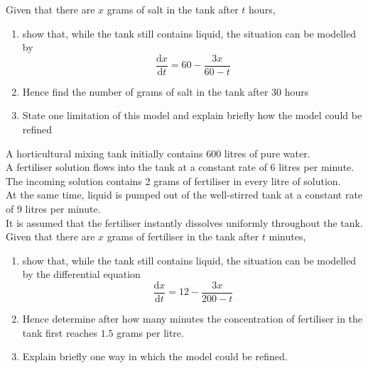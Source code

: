 \documentclass[leqno]{article}
\begin{document}
\begin{enumerate}[
  label=\textbf{\arabic*.},
  leftmargin=*,
  topsep=0pt,
  partopsep=0pt,
  parsep=0pt
]
Given that there are $x$ grams of salt in the tank after $t$ hours, \\
\begin{enumerate}[label=\textbf{(\alph*)}]
  \item show that, while the tank still contains liquid, the situation can be modelled by
  \[
  \frac{\mathrm{d}x}{\mathrm{d}t}=60-\frac{3x}{60-t}
  \] 
  \item Hence find the number of grams of salt in the tank after $30$ hours  \\
  \item State one limitation of this model and explain briefly how the model could be refined  \\
\end{enumerate}

\newpage

\questionitem

A horticultural mixing tank initially contains 600 litres of pure water. \\

A fertiliser solution flows into the tank at a constant rate of 6 litres per minute. The incoming solution contains 2 grams of fertiliser in every litre of solution. \\

At the same time, liquid is pumped out of the well-stirred tank at a constant rate of 9 litres per minute. \\

It is assumed that the fertiliser instantly dissolves uniformly throughout the tank. \\

Given that there are $x$ grams of fertiliser in the tank after $t$ minutes, \\

\begin{enumerate}[label=\textbf{(\alph*)}]
  \item show that, while the tank still contains liquid, the situation can be modelled by the differential equation
  \[
  \frac{\mathrm{d}x}{\mathrm{d}t}=12-\frac{3x}{200-t}
  \]
  \item Hence determine after how many minutes the concentration of fertiliser in the tank first reaches $1.5$ grams per litre.  \\
  \item Explain briefly one way in which the model could be refined.  \\
\end{enumerate}


\end{enumerate}
\end{document}
